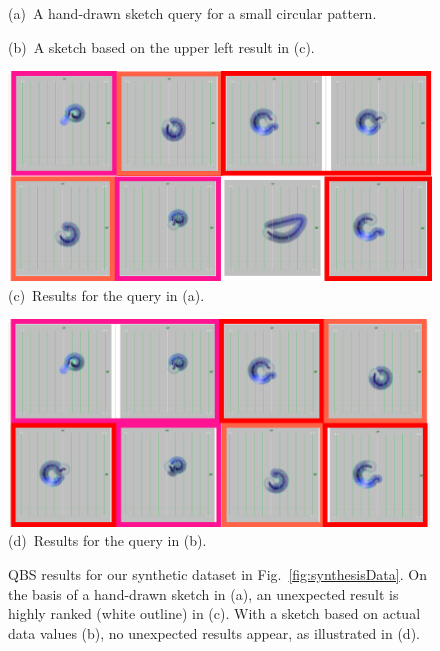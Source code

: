 \begin{figure}[tb]
\begin{minipage}{0.49\linewidth}
    \end{minipage}
    \begin{minipage}{0.49\linewidth}
        \centering
        \footnotesize{\sf (a)~A hand-drawn sketch query for a small circular pattern.}
    \end{minipage}
    \begin{minipage}{0.49\linewidth}
        \centering
        \footnotesize{\sf (b)~A sketch based on the upper left result in (c). 
        }
    \end{minipage}
    \begin{minipage}{0.49\linewidth}
        \centering
        \includegraphics[width=.99\linewidth]{vgtc_journal_latex/figures/QBSResultsHanddrawn_revised.png}\\
        \footnotesize{\sf (c)~Results for the query in (a).}
    \end{minipage}
    \begin{minipage}{0.49\linewidth}
        \centering
        \includegraphics[width=.99\linewidth]{vgtc_journal_latex/figures/QBSResultsResultQuery_revised.png}\\
        \footnotesize{\sf (d)~Results for the query in (b).}
    \end{minipage}
    \caption{QBS results for our synthetic dataset in Fig.~\ref{fig:synthesisData}.
        On the basis of a hand-drawn sketch in (a), an unexpected result is highly ranked (white outline) in (c). 
        With a sketch based on actual data values (b), no unexpected results appear, as illustrated in (d).
        }
    \label{fig:QBSDemodata}
\end{figure}
